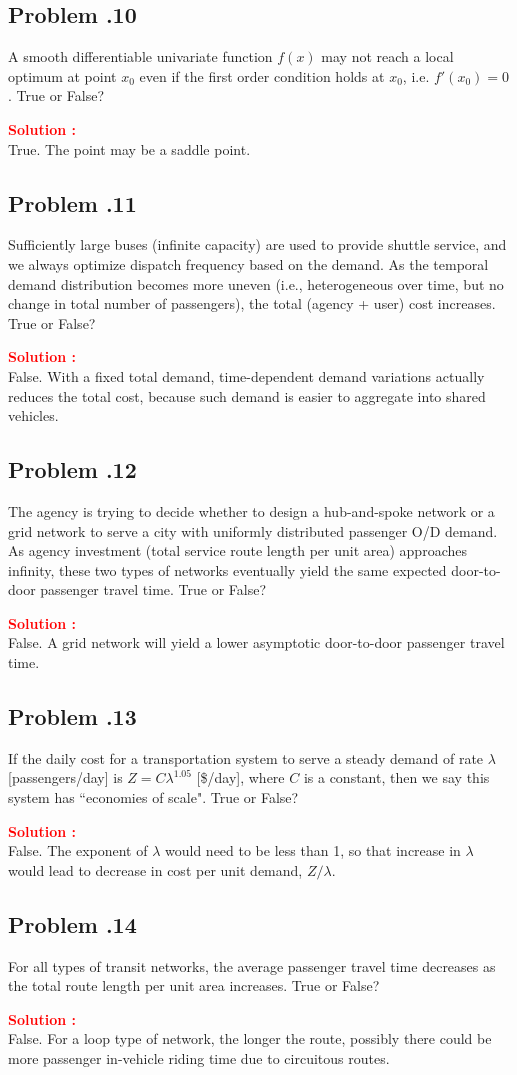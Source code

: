 \documentclass[12pt]{article}
\newcommand{\customsubsection}[1]{
  \subsection*{Problem \thesection.#1}
}
\begin{document}
\customsubsection{10}
A smooth differentiable univariate function $f(x)$ may not reach a local optimum at point $x_0$ even if the first order condition holds at $x_0$, i.e. $f' (x_0) =0$. True or False?


\textbf{\textcolor{red}{Solution :}} \\
True. The point may be a saddle point.
\newpage

\customsubsection{11}
Sufficiently large buses (infinite capacity) are used to provide shuttle service, and we always optimize dispatch frequency based on the demand. As the temporal demand distribution becomes more uneven (i.e., heterogeneous over time, but no change in total number of passengers), the total (agency + user) cost increases. True or False?


\textbf{\textcolor{red}{Solution :}} \\
False. With a fixed total demand, time-dependent demand variations actually reduces the total cost, because such demand is easier to aggregate into shared vehicles.
\newpage

\customsubsection{12}
The agency is trying to decide whether to design a hub-and-spoke network or a grid network to serve a city with uniformly distributed passenger O/D demand. As agency investment (total service route length per unit area) approaches infinity, these two types of networks eventually yield the same expected door-to-door passenger travel time. True or False?


\textbf{\textcolor{red}{Solution :}} \\
False. A grid network will yield a lower asymptotic door-to-door passenger travel time.
\newpage


\customsubsection{13}
If the daily cost for a transportation system to serve a steady demand of rate $\lambda$ [passengers/day] is $ Z= C\lambda^{1.05}$ [\$/day], where $C$ is a constant, then we say this system has ``economies of scale". True or False?


\textbf{\textcolor{red}{Solution :}} \\
False. The exponent of $\lambda$ would need to be less than 1, so that increase in $\lambda$ would lead to decrease in cost per unit demand, $Z/\lambda$.

\newpage

\customsubsection{14}
For all types of transit networks, the average passenger travel time decreases as the total route length per unit area increases. True or False?


\textbf{\textcolor{red}{Solution :}} \\
False. For a loop type of network, the longer the route, possibly there could be more passenger in-vehicle riding time due to circuitous routes.
\end{document}
